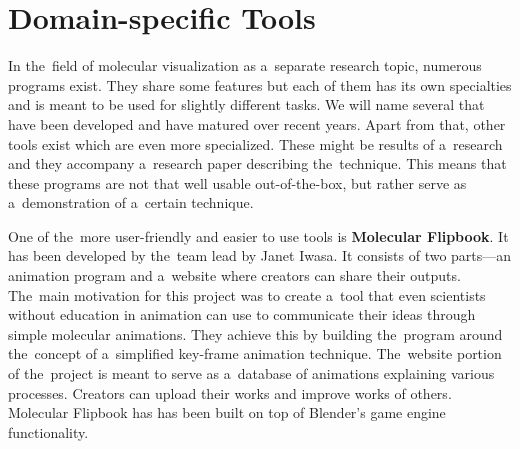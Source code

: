 \documentclass[
  digital, %
  table,   %
  nolof,     %
  nolot,     %
  oneside,
]{fithesis3}
\begin{document}


\section{Domain-specific Tools}
In the field of molecular visualization as a separate research topic, numerous programs exist. They share some features but each of them has its own specialties and is meant to be used for slightly different tasks. We will name several that have been developed and have matured over recent years. Apart from that, other tools exist which are even more specialized. These might be results of a research and they accompany a research paper describing the technique. This means that these programs are not that well usable out-of-the-box, but rather serve as a demonstration of a certain technique.

One of the more user-friendly and easier to use tools is \textbf{Molecular Flipbook}. It has been developed by the team lead by Janet Iwasa. It consists of two parts—an animation program and a website where creators can share their outputs. The main motivation for this project was to create a tool that even scientists without education in animation can use to communicate their ideas through simple molecular animations. They achieve this by building the program around the concept of a simplified key-frame animation technique. The website portion of the project is meant to serve as a database of animations explaining various processes. Creators can upload their works and improve works of others. Molecular Flipbook has has been built on top of Blender's game engine functionality.
\end{document}
